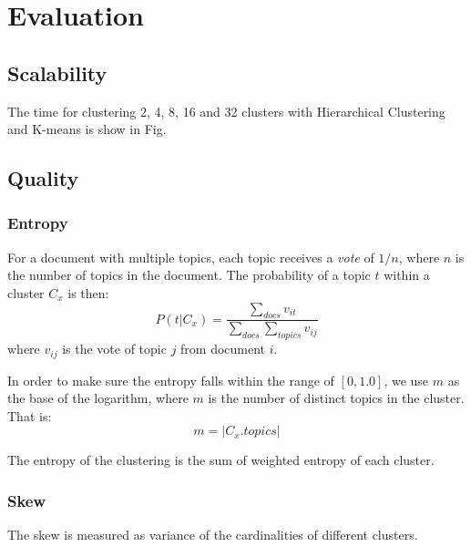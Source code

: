 \documentclass{article}
\begin{document}
\section{Evaluation}
\subsection{Scalability}
The time for clustering 2, 4, 8, 16 and 32 clusters with Hierarchical Clustering
and K-means is show in Fig.
\subsection{Quality}
\subsubsection{Entropy}
For a document with multiple topics, each topic receives a \emph{vote} of
$1/n$, where $n$ is the number of topics in the document. The probability of a
topic $t$ within a cluster $C_x$ is then:
\begin{equation}
P(t|C_x)=\frac{\sum_{docs}v_{it}}{\sum_{docs}\sum_{topics}v_{ij}}
\end{equation}
where $v_{ij}$ is the vote of topic $j$ from document $i$.

In order to make sure the entropy falls within the range of $[0, 1.0]$, we use
$m$ as the base of the logarithm, where $m$ is the number of distinct topics in
the cluster. That is:
\begin{equation}
m = |C_x.topics|
\end{equation}

The entropy of the clustering is the sum of weighted entropy of each cluster. 

\subsubsection{Skew}
The skew is measured as variance of the cardinalities of different clusters.
\end{document}
